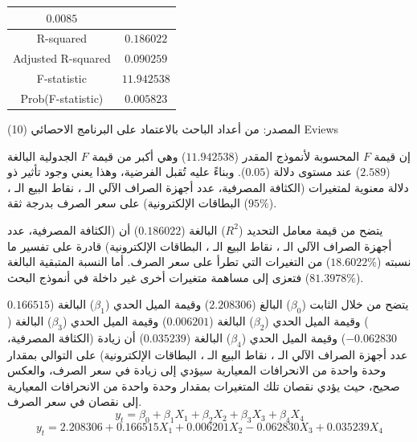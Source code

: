 \documentclass[10pt,a4paper]{report}
\begin{document}
\begin{doublespacing}
\begin{table}[H]
{\begin{tabular}{|ccccc|}
				$0.0085$ \\ \hline
				\multicolumn{1}{|c|}{\textenglish{R-squared}} &
				\multicolumn{4}{c|}{$0.186022$} \\ \hline
				\multicolumn{1}{|c|}{\textenglish{Adjusted   R-squared}} &
				\multicolumn{4}{c|}{$0.090259$} \\ \hline
				\multicolumn{1}{|c|}{\textenglish{F-statistic}} &
				\multicolumn{4}{c|}{$11.942538$} \\ \hline
				\multicolumn{1}{|c|}{\textenglish{Prob(F-statistic)}} &
				\multicolumn{4}{c|}{$0.005823$} \\ \hline
			\end{tabular}%
		}
	\end{table}
	
المصدر: من أعداد الباحث بالاعتماد على البرنامج الاحصائي (10) Eviews

إن قيمة \(F\) المحسوبة لأنموذج المقدر ($11.942538$) وهي أكبر من قيمة \(F\) الجدولية البالغة ($2.589$) عند مستوى دلالة ($0.05$). وبناءً عليه تُقبل الفرضية، وهذا يعني وجود تأثير ذو دلالة معنوية لمتغيرات ({الكثافة المصرفية، عدد أجهزة الصراف الآلي الـ ، نقاط البيع الـ ، البطاقات الإلكترونية}) على سعر الصرف بدرجة ثقة ($95\%$).

يتضح من قيمة معامل التحديد (\(R^2\)) البالغة ($0.186022$) أن ({الكثافة المصرفية، عدد أجهزة الصراف الآلي الـ ، نقاط البيع الـ ، البطاقات الإلكترونية}) قادرة على تفسير ما نسبته ($18.6022\%$) من التغيرات التي تطرأ على سعر الصرف. أما النسبة المتبقية البالغة ($81.3978\%$) فتعزى إلى مساهمة متغيرات أخرى غير داخلة في أنموذج البحث.

يتضح من خلال الثابت (\(\beta_0\)) البالغ ($2.208306$) وقيمة الميل الحدي (\(\beta_1\)) البالغة ($0.166515$) وقيمة الميل الحدي (\(\beta_2\)) البالغة ($0.006201$) وقيمة الميل الحدي (\(\beta_3\)) البالغة ($-0.062830$) وقيمة الميل الحدي (\(\beta_4\)) البالغة ($0.035239$) أن زيادة ({الكثافة المصرفية، عدد أجهزة الصراف الآلي الـ ، نقاط البيع الـ ، البطاقات الإلكترونية}) على التوالي بمقدار وحدة واحدة من الانحرافات المعيارية سيؤدي إلى زيادة في سعر الصرف، والعكس صحيح، حيث يؤدي نقصان تلك المتغيرات بمقدار وحدة واحدة من الانحرافات المعيارية إلى نقصان في سعر الصرف.
\begin{equation}
	y_t=\beta_0+\beta_1X_1+\beta_2X_2+\beta_3X_3+\beta_4X_4
\end{equation}
\[
y_t = 2.208306 + 0.166515 X_1 + 0.006201 X_2 - 0.062830 X_3 + 0.035239 X_4
\]


\end{doublespacing}
\end{document}
